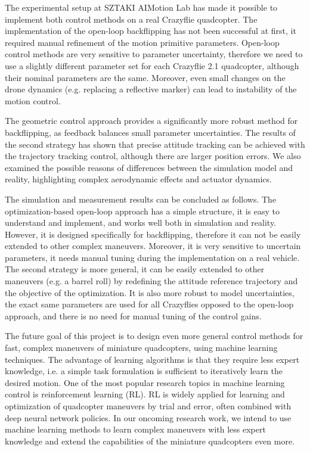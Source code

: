 The experimental setup at SZTAKI AIMotion Lab has made it possible to implement both control methods on a real Crazyflie quadcopter. The implementation of the open-loop backflipping has not been successful at first, it required manual refinement of the motion primitive parameters. Open-loop control methods are very sensitive to parameter uncertainty, therefore we need to use a slightly different parameter set for each Crazyflie 2.1 quadcopter, although their nominal parameters are the same. Moreover, even small changes on the drone dynamics (e.g. replacing a reflective marker) can lead to instability of the motion control.

The geometric control approach provides a significantly more robust method for backflipping, as feedback balances small parameter uncertainties. The results of the second strategy has shown that precise attitude tracking can be achieved with the trajectory tracking control, although there are larger position errors. We also examined the possible reasons of differences between the simulation model and reality, highlighting complex aerodynamic effects and actuator dynamics.

The simulation and measurement results can be concluded as follows. The optimization-based open-loop approach has a simple structure, it is easy to understand and implement, and works well both in simulation and reality. However, it is designed specifically for backflipping, therefore it can not be easily extended to other complex maneuvers. Moreover, it is very sensitive to uncertain parameters, it needs manual tuning during the implementation on a real vehicle. The second strategy is more general, it can be easily extended to other maneuvers (e.g. a barrel roll) by redefining the attitude reference trajectory and the objective of the optimization. It is also more robust to model uncertainties, the exact same parameters are used for all Crazyflies opposed to the open-loop approach, and there is no need for manual tuning of the control gains.

The future goal of this project is to design even more general control methods for fast, complex maneuvers of miniature quadcopters, using machine learning techniques. The advantage of learning algorithms is that they require less expert knowledge, i.e. a simple task formulation is sufficient to iteratively learn the desired motion. One of the most popular research topics in machine learning control is reinforcement learning (RL). RL is widely applied for learning and optimization of quadcopter maneuvers by trial and error, often combined with deep neural network policies. In our oncoming research work, we intend to use machine learning methods to learn complex maneuvers with less expert knowledge and extend the capabilities of the miniature quadcopters even more.

